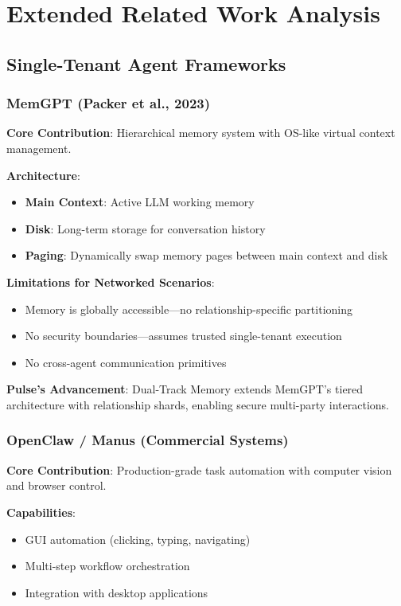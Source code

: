 \chapter{Extended Related Work Analysis}
\label{appendix:related_works}

\section{Single-Tenant Agent Frameworks}

\subsection{MemGPT (Packer et al., 2023)}

\textbf{Core Contribution}: Hierarchical memory system with OS-like virtual context management.

\textbf{Architecture}:
\begin{itemize}
    \item \textbf{Main Context}: Active LLM working memory
    \item \textbf{Disk}: Long-term storage for conversation history
    \item \textbf{Paging}: Dynamically swap memory pages between main context and disk
\end{itemize}

\textbf{Limitations for Networked Scenarios}:
\begin{itemize}
    \item Memory is globally accessible—no relationship-specific partitioning
    \item No security boundaries—assumes trusted single-tenant execution
    \item No cross-agent communication primitives
\end{itemize}

\textbf{Pulse's Advancement}: Dual-Track Memory extends MemGPT's tiered architecture with relationship shards, enabling secure multi-party interactions.

\subsection{OpenClaw / Manus (Commercial Systems)}

\textbf{Core Contribution}: Production-grade task automation with computer vision and browser control.

\textbf{Capabilities}:
\begin{itemize}
    \item GUI automation (clicking, typing, navigating)
    \item Multi-step workflow orchestration
    \item Integration with desktop applications
\end{itemize}

